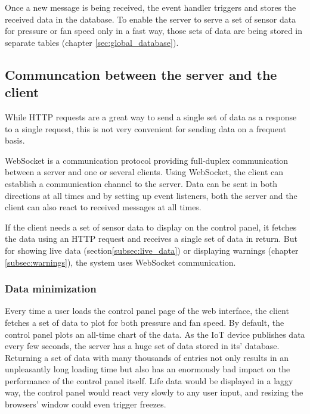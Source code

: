 Once a new message is being received, the event handler triggers and stores the received data in the database. To enable the server to serve a set of sensor data for pressure or fan speed only in a fast way, those sets of data are being stored in separate tables (chapter \ref{sec:global_database}).



\subsection{Communcation between the server and the client}
\label{subsec:communication_between_teh_server_and_the_client}

While HTTP requests are a great way to send a single set of data as a response to a single request, this is not very convenient for sending data on a frequent basis.

WebSocket is a communication protocol providing full-duplex communication between a server and one or several clients. Using WebSocket, the client can establish a communication channel to the server. Data can be sent in both directions at all times and by setting up event listeners, both the server and the client can also react to received messages at all times.

If the client needs a set of sensor data to display on the control panel, it fetches the data using an HTTP request and receives a single set of data in return. But for showing live data (section\ref{subsec:live_data}) or displaying warnings (chapter \ref{subsec:warnings}), the system uses WebSocket communication.


\subsubsection{Data minimization}
\label{subsec:data_minimization}

Every time a user loads the control panel page of the web interface, the client fetches a set of data to plot for both pressure and fan speed. By default, the control panel plots an all-time chart of the data. As the IoT device publishes data every few seconds, the server has a huge set of data stored in its' database. Returning a set of data with many thousands of entries not only results in an unpleasantly long loading time but also has an enormously bad impact on the performance of the control panel itself. Life data would be displayed in a laggy way, the control panel would react very slowly to any user input, and resizing the browsers' window could even trigger freezes.

